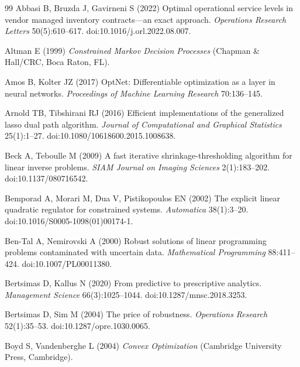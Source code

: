 \documentclass[11pt,letterpaper]{article}
\theoremstyle{definition}
\newcommand{\1}{\mathbf 1}
\begin{document}
\begin{thebibliography}{99}
Abbasi B, Bruzda J, Gavirneni S (2022) Optimal operational service levels in vendor managed inventory contracts---an exact approach. \emph{Operations Research Letters} 50(5):610--617. doi:10.1016/j.orl.2022.08.007.

Altman E (1999) \emph{Constrained Markov Decision Processes} (Chapman \& Hall/CRC, Boca Raton, FL).

Amos B, Kolter JZ (2017) OptNet: Differentiable optimization as a layer in neural networks. \emph{Proceedings of Machine Learning Research} 70:136--145.

Arnold TB, Tibshirani RJ (2016) Efficient implementations of the generalized lasso dual path algorithm. \emph{Journal of Computational and Graphical Statistics} 25(1):1--27. doi:10.1080/10618600.2015.1008638.

Beck A, Teboulle M (2009) A fast iterative shrinkage-thresholding algorithm for linear inverse problems. \emph{SIAM Journal on Imaging Sciences} 2(1):183--202. doi:10.1137/080716542.

Bemporad A, Morari M, Dua V, Pistikopoulos EN (2002) The explicit linear quadratic regulator for constrained systems. \emph{Automatica} 38(1):3--20. doi:10.1016/S0005-1098(01)00174-1.

Ben-Tal A, Nemirovski A (2000) Robust solutions of linear programming problems contaminated with uncertain data. \emph{Mathematical Programming} 88:411--424. doi:10.1007/PL00011380.

Bertsimas D, Kallus N (2020) From predictive to prescriptive analytics. \emph{Management Science} 66(3):1025--1044. doi:10.1287/mnsc.2018.3253.

Bertsimas D, Sim M (2004) The price of robustness. \emph{Operations Research} 52(1):35--53. doi:10.1287/opre.1030.0065.

Boyd S, Vandenberghe L (2004) \emph{Convex Optimization} (Cambridge University Press, Cambridge).


\end{thebibliography}
\end{document}
